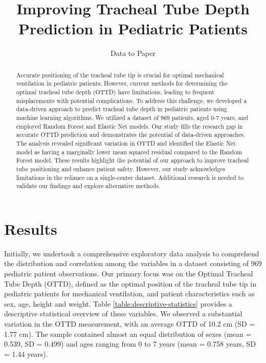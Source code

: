 \documentclass[11pt]{article}
\title{Improving Tracheal Tube Depth Prediction in Pediatric Patients}
\author{Data to Paper}
\begin{document}
\maketitle
\begin{abstract}
Accurate positioning of the tracheal tube tip is crucial for optimal mechanical ventilation in pediatric patients. However, current methods for determining the optimal tracheal tube depth (OTTD) have limitations, leading to frequent misplacements with potential complications. To address this challenge, we developed a data-driven approach to predict tracheal tube depth in pediatric patients using machine learning algorithms. We utilized a dataset of 969 patients, aged 0-7 years, and employed Random Forest and Elastic Net models. Our study fills the research gap in accurate OTTD prediction and demonstrates the potential of data-driven approaches. The analysis revealed significant variation in OTTD and identified the Elastic Net model as having a marginally lower mean squared residual compared to the Random Forest model. These results highlight the potential of our approach to improve tracheal tube positioning and enhance patient safety. However, our study acknowledges limitations in the reliance on a single-center dataset. Additional research is needed to validate our findings and explore alternative methods.
\end{abstract}
\section*{Results}

Initially, we undertook a comprehensive exploratory data analysis to comprehend the distribution and correlation among the variables in a dataset consisting of 969 pediatric patient observations. Our primary focus was on the Optimal Tracheal Tube Depth (OTTD), defined as the optimal position of the tracheal tube tip in pediatric patients for mechanical ventilation, and patient characteristics such as sex, age, height and weight. Table \ref{table:descriptive-statistics} provides a descriptive statistical overview of these variables. We observed a substantial variation in the OTTD measurement, with an average OTTD of 10.2 cm (SD = 1.77 cm). The sample contained almost an equal distribution of sexes (mean = 0.539, SD = 0.499) and ages ranging from 0 to 7 years (mean = 0.758 years, SD = 1.44 years).
\end{document}
